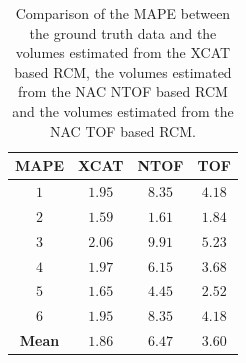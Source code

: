             \begin{table}
                \centering
                
                \captionsetup{singlelinecheck=false, justification=raggedright}
                \caption{Comparison of the \gls{MAPE} between the ground truth data and the volumes estimated from the \gls{XCAT} based \gls{RCM}, the volumes estimated from the \gls{NAC} \gls{NTOF} based \gls{RCM} and the volumes estimated from the \gls{NAC} \gls{TOF} based \gls{RCM}.}
                
                \resizebox*{1.0\linewidth}{!}
                {
                    \begin{tabular}{||c|ccc||}
                        \hline
                        \textbf{\gls{MAPE}} & \textbf{XCAT} & \textbf{\gls{NTOF}} & \textbf{\gls{TOF}} \\
                        \hline
                        \textbf{$1$} & $1.95$ & $8.35$ & $4.18$ \\
                        \textbf{$2$} & $1.59$ & $1.61$ & $1.84$ \\
                        \textbf{$3$} & $2.06$ & $9.91$ & $5.23$ \\
                        \textbf{$4$} & $1.97$ & $6.15$ & $3.68$ \\
                        \textbf{$5$} & $1.65$ & $4.45$ & $2.52$ \\
                        \textbf{$6$} & $1.95$ & $8.35$ & $4.18$ \\
                        \hline
                        \textbf{Mean} & $1.86$ & $6.47$ & $3.60$ \\
                        \hline
                    \end{tabular}
                } \label{tab:mape}
            \end{table}
            
